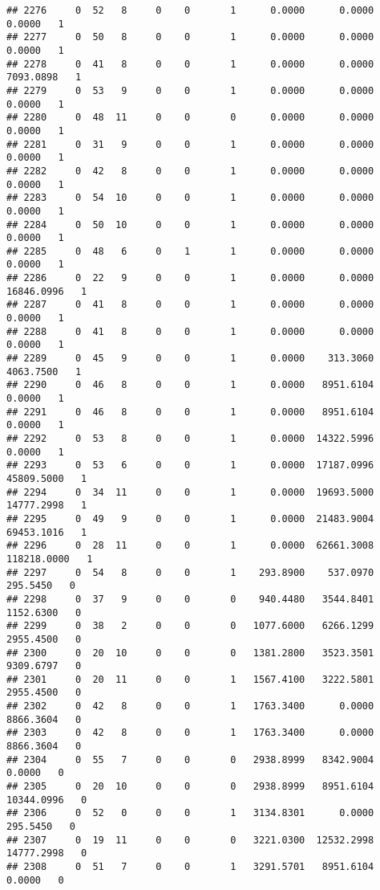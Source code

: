\documentclass[
]{article}
\begin{document}
\begin{enumerate}
\begin{verbatim}
## 2276     0  52   8     0    0       1      0.0000      0.0000      0.0000   1
## 2277     0  50   8     0    0       1      0.0000      0.0000      0.0000   1
## 2278     0  41   8     0    0       1      0.0000      0.0000   7093.0898   1
## 2279     0  53   9     0    0       1      0.0000      0.0000      0.0000   1
## 2280     0  48  11     0    0       0      0.0000      0.0000      0.0000   1
## 2281     0  31   9     0    0       1      0.0000      0.0000      0.0000   1
## 2282     0  42   8     0    0       1      0.0000      0.0000      0.0000   1
## 2283     0  54  10     0    0       1      0.0000      0.0000      0.0000   1
## 2284     0  50  10     0    0       1      0.0000      0.0000      0.0000   1
## 2285     0  48   6     0    1       1      0.0000      0.0000      0.0000   1
## 2286     0  22   9     0    0       1      0.0000      0.0000  16846.0996   1
## 2287     0  41   8     0    0       1      0.0000      0.0000      0.0000   1
## 2288     0  41   8     0    0       1      0.0000      0.0000      0.0000   1
## 2289     0  45   9     0    0       1      0.0000    313.3060   4063.7500   1
## 2290     0  46   8     0    0       1      0.0000   8951.6104      0.0000   1
## 2291     0  46   8     0    0       1      0.0000   8951.6104      0.0000   1
## 2292     0  53   8     0    0       1      0.0000  14322.5996      0.0000   1
## 2293     0  53   6     0    0       1      0.0000  17187.0996  45809.5000   1
## 2294     0  34  11     0    0       1      0.0000  19693.5000  14777.2998   1
## 2295     0  49   9     0    0       1      0.0000  21483.9004  69453.1016   1
## 2296     0  28  11     0    0       1      0.0000  62661.3008 118218.0000   1
## 2297     0  54   8     0    0       1    293.8900    537.0970    295.5450   0
## 2298     0  37   9     0    0       0    940.4480   3544.8401   1152.6300   0
## 2299     0  38   2     0    0       0   1077.6000   6266.1299   2955.4500   0
## 2300     0  20  10     0    0       0   1381.2800   3523.3501   9309.6797   0
## 2301     0  20  11     0    0       1   1567.4100   3222.5801   2955.4500   0
## 2302     0  42   8     0    0       1   1763.3400      0.0000   8866.3604   0
## 2303     0  42   8     0    0       1   1763.3400      0.0000   8866.3604   0
## 2304     0  55   7     0    0       0   2938.8999   8342.9004      0.0000   0
## 2305     0  20  10     0    0       0   2938.8999   8951.6104  10344.0996   0
## 2306     0  52   0     0    0       1   3134.8301      0.0000    295.5450   0
## 2307     0  19  11     0    0       0   3221.0300  12532.2998  14777.2998   0
## 2308     0  51   7     0    0       1   3291.5701   8951.6104      0.0000   0

\end{verbatim}
\end{enumerate}
\end{document}
